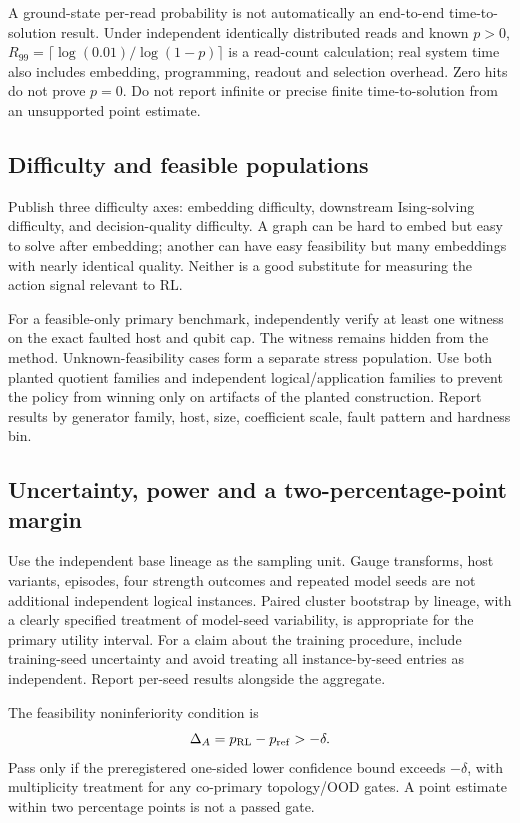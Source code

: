 \documentclass[11pt,a4paper]{article}
\theoremstyle{definition}\newtheorem{definition}[proposition]{Definition}
\begin{document}
A ground-state per-read probability is not automatically an end-to-end time-to-solution result. Under independent identically distributed reads and known $p>0$, $R_{99}=\lceil\log(0.01)/\log(1-p)\rceil$ is a read-count calculation; real system time also includes embedding, programming, readout and selection overhead. Zero hits do not prove $p=0$. Do not report infinite or precise finite time-to-solution from an unsupported point estimate.

\subsection{Difficulty and feasible populations}
Publish three difficulty axes: embedding difficulty, downstream Ising-solving difficulty, and decision-quality difficulty. A graph can be hard to embed but easy to solve after embedding; another can have easy feasibility but many embeddings with nearly identical quality. Neither is a good substitute for measuring the action signal relevant to RL.

For a feasible-only primary benchmark, independently verify at least one witness on the exact faulted host and qubit cap. The witness remains hidden from the method. Unknown-feasibility cases form a separate stress population. Use both planted quotient families and independent logical/application families to prevent the policy from winning only on artifacts of the planted construction. Report results by generator family, host, size, coefficient scale, fault pattern and hardness bin.

\subsection{Uncertainty, power and a two-percentage-point margin}
Use the independent base lineage as the sampling unit. Gauge transforms, host variants, episodes, four strength outcomes and repeated model seeds are not additional independent logical instances. Paired cluster bootstrap by lineage, with a clearly specified treatment of model-seed variability, is appropriate for the primary utility interval. For a claim about the training procedure, include training-seed uncertainty and avoid treating all instance-by-seed entries as independent. Report per-seed results alongside the aggregate.

The feasibility noninferiority condition is
\begin{equation}
\Delta_A=p_{\rm RL}-p_{\rm ref}>-\delta.
\end{equation}
Pass only if the preregistered one-sided lower confidence bound exceeds $-\delta$, with multiplicity treatment for any co-primary topology/OOD gates. A point estimate within two percentage points is not a passed gate.
\end{document}
